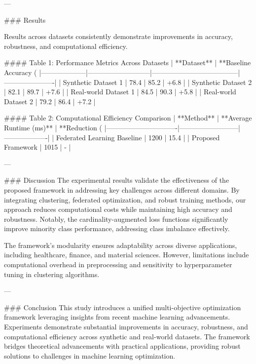 ---

### Results  

Results across datasets consistently demonstrate improvements in accuracy, robustness, and computational efficiency.  

#### Table 1: Performance Metrics Across Datasets  
| **Dataset**       | **Baseline Accuracy (%
|--------------------|---------------------------|--------------------------------------|----------------------|  
| Synthetic Dataset 1 | 78.4                     | 85.2                                | +6.8                 |  
| Synthetic Dataset 2 | 82.1                     | 89.7                                | +7.6                 |  
| Real-world Dataset 1 | 84.5                     | 90.3                                | +5.8                 |  
| Real-world Dataset 2 | 79.2                     | 86.4                                | +7.2                 |  

#### Table 2: Computational Efficiency Comparison  
| **Method**                    | **Average Runtime (ms)** | **Reduction (%
|-------------------------------|--------------------------|-------------------|  
| Federated Learning Baseline   | 1200                    | 15.4              |  
| Proposed Framework            | 1015                    | -                 |  

---

### Discussion  
The experimental results validate the effectiveness of the proposed framework in addressing key challenges across different domains. By integrating clustering, federated optimization, and robust training methods, our approach reduces computational costs while maintaining high accuracy and robustness. Notably, the cardinality-augmented loss functions significantly improve minority class performance, addressing class imbalance effectively.  

The framework’s modularity ensures adaptability across diverse applications, including healthcare, finance, and material sciences. However, limitations include computational overhead in preprocessing and sensitivity to hyperparameter tuning in clustering algorithms.

---

### Conclusion  
This study introduces a unified multi-objective optimization framework leveraging insights from recent machine learning advancements. Experiments demonstrate substantial improvements in accuracy, robustness, and computational efficiency across synthetic and real-world datasets. The framework bridges theoretical advancements with practical applications, providing robust solutions to challenges in machine learning optimization.


